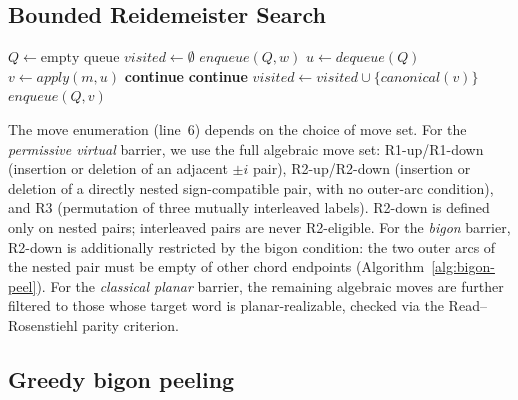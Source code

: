 
\subsection{Bounded Reidemeister Search}

\begin{algorithm}[t]
\caption{Bounded Reidemeister Search}
\label{alg:brs}
\begin{algorithmic}[1]
\State $Q \gets \text{empty queue}$ 
\State $\textit{visited} \gets \emptyset$
\State $\textit{enqueue}(Q, w)$
  \State $u \gets \textit{dequeue}(Q)$
    \Return \True
  \EndIf
    \State $v \gets \textit{apply}(m, u)$
      \State \textbf{continue}
    \EndIf
      \State \textbf{continue}
    \EndIf
    \State $\textit{visited} \gets \textit{visited} \cup \{\textit{canonical}(v)\}$
    \State $\textit{enqueue}(Q, v)$
  \EndFor
\EndWhile
\Return \False
\end{algorithmic}
\end{algorithm}

The move enumeration (line~6) depends on the choice of move set.
For the \emph{permissive virtual} barrier, we use the full algebraic
move set: R1-up/R1-down (insertion or deletion of an adjacent $\pm i$
pair), R2-up/R2-down (insertion or deletion of a directly nested
sign-compatible pair, with no outer-arc condition), and R3 (permutation
of three mutually interleaved labels).  R2-down is defined only on
nested pairs; interleaved pairs are never R2-eligible.
For the \emph{bigon} barrier, R2-down is additionally restricted by the
bigon condition: the two outer arcs of the nested pair must be empty of
other chord endpoints (Algorithm~\ref{alg:bigon-peel}).
For the \emph{classical planar} barrier, the remaining algebraic moves
are further filtered to those whose target word is planar-realizable,
checked via the Read--Rosenstiehl parity criterion.

\subsection{Greedy bigon peeling}

